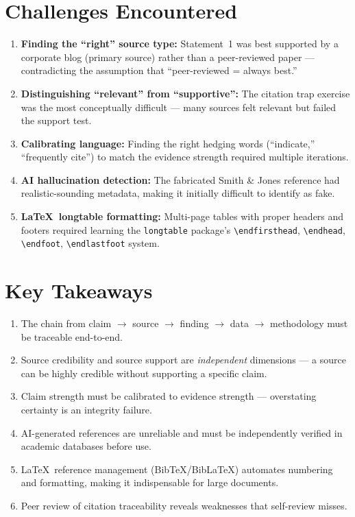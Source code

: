 \documentclass[11pt, a4paper]{article}
\begin{document}
\section{Challenges Encountered}

\begin{enumerate}[nosep]
    \item \textbf{Finding the ``right'' source type:} Statement~1 was best supported by a corporate blog (primary source) rather than a peer-reviewed paper --- contradicting the assumption that ``peer-reviewed = always best.''
    \item \textbf{Distinguishing ``relevant'' from ``supportive'':} The citation trap exercise was the most conceptually difficult --- many sources felt relevant but failed the support test.
    \item \textbf{Calibrating language:} Finding the right hedging words (``indicate,'' ``frequently cite'') to match the evidence strength required multiple iterations.
    \item \textbf{AI hallucination detection:} The fabricated Smith \& Jones reference had realistic-sounding metadata, making it initially difficult to identify as fake.
    \item \textbf{\LaTeX\ longtable formatting:} Multi-page tables with proper headers and footers required learning the \texttt{longtable} package's \texttt{\textbackslash endfirsthead}, \texttt{\textbackslash endhead}, \texttt{\textbackslash endfoot}, \texttt{\textbackslash endlastfoot} system.
\end{enumerate}

\section{Key Takeaways}

\begin{enumerate}[nosep]
    \item The chain from claim $\rightarrow$ source $\rightarrow$ finding $\rightarrow$ data $\rightarrow$ methodology must be traceable end-to-end.
    \item Source credibility and source support are \emph{independent} dimensions --- a source can be highly credible without supporting a specific claim.
    \item Claim strength must be calibrated to evidence strength --- overstating certainty is an integrity failure.
    \item AI-generated references are unreliable and must be independently verified in academic databases before use.
    \item \LaTeX\ reference management (BibTeX/BibLaTeX) automates numbering and formatting, making it indispensable for large documents.
    \item Peer review of citation traceability reveals weaknesses that self-review misses.
\end{enumerate}
\end{document}
